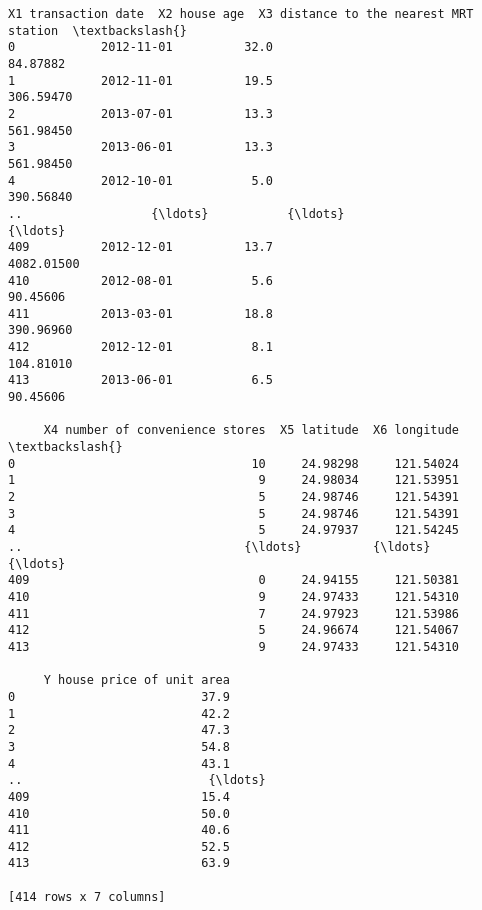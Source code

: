 \documentclass[11pt]{article}
\makeatletter
\newcommand{\boxspacing}{\kern\kvtcb@left@rule\kern\kvtcb@boxsep}
\newcommand{\prompt}[4]{
        {\ttfamily\llap{{\color{#2}[#3]:\hspace{3pt}#4}}\vspace{-\baselineskip}}
    }
\makeatother
\begin{document}
            \begin{tcolorbox}[breakable, size=fbox, boxrule=.5pt, pad at break*=1mm, opacityfill=0]
\prompt{Out}{outcolor}{211}{\boxspacing}
\begin{Verbatim}[commandchars=\\\{\}]
    X1 transaction date  X2 house age  X3 distance to the nearest MRT station  \textbackslash{}
0            2012-11-01          32.0                                84.87882
1            2012-11-01          19.5                               306.59470
2            2013-07-01          13.3                               561.98450
3            2013-06-01          13.3                               561.98450
4            2012-10-01           5.0                               390.56840
..                  {\ldots}           {\ldots}                                     {\ldots}
409          2012-12-01          13.7                              4082.01500
410          2012-08-01           5.6                                90.45606
411          2013-03-01          18.8                               390.96960
412          2012-12-01           8.1                               104.81010
413          2013-06-01           6.5                                90.45606

     X4 number of convenience stores  X5 latitude  X6 longitude  \textbackslash{}
0                                 10     24.98298     121.54024
1                                  9     24.98034     121.53951
2                                  5     24.98746     121.54391
3                                  5     24.98746     121.54391
4                                  5     24.97937     121.54245
..                               {\ldots}          {\ldots}           {\ldots}
409                                0     24.94155     121.50381
410                                9     24.97433     121.54310
411                                7     24.97923     121.53986
412                                5     24.96674     121.54067
413                                9     24.97433     121.54310

     Y house price of unit area
0                          37.9
1                          42.2
2                          47.3
3                          54.8
4                          43.1
..                          {\ldots}
409                        15.4
410                        50.0
411                        40.6
412                        52.5
413                        63.9

[414 rows x 7 columns]
\end{Verbatim}
\end{tcolorbox}
        
\end{document}
